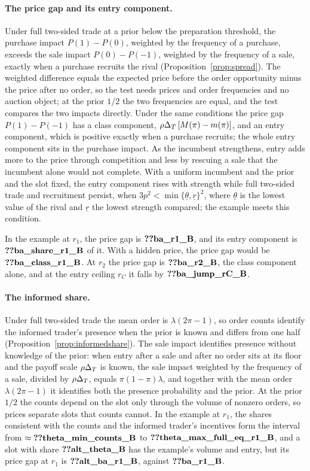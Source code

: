 \paragraph{The price gap and its entry component.} Under full two-sided trade at a prior below the preparation
threshold, the purchase impact \(P(1)-P(0)\), weighted by the frequency of a purchase, exceeds the sale impact
\(P(0)-P(-1)\), weighted by the frequency of a sale, exactly when a purchase recruits the rival
(Proposition~\ref{prop:spread}). The weighted difference equals the expected price before the order opportunity
minus the price after no order, so the test needs prices and order frequencies and no auction object; at the prior
\(1/2\) the two frequencies are equal, and the test compares the two impacts directly. Under the same conditions the
price gap \(P(1)-P(-1)\) has a class component, \(\rho\Delta_T\,[M(\pi)-m(\pi)]\), and an entry component, which is
positive exactly when a purchase recruits; the whole entry component sits in the purchase impact. As the incumbent
strengthens, entry adds more to the price through competition and less by rescuing a sale that the incumbent alone
would not complete. With a uniform incumbent and the prior and the slot fixed, the entry component rises with
strength while full two-sided trade and recruitment persist, when \(3p^2<\min\{\underline\theta,\underline r\}^2\),
where \(\underline\theta\) is the lowest value of the rival and \(\underline r\) the lowest strength compared; the
example meets this condition.

In the example at \(r_1\), the price gap is \(\reg{ba_r1_B}\), and its entry component is \(\reg{ba_share_r1_B}\) of
it. With a hidden price, the price gap would be \(\reg{ba_class_r1_B}\). At \(r_2\) the price gap is
\(\reg{ba_r2_B}\), the class component alone, and at the entry ceiling \(r_C\) it falls by \(\reg{ba_jump_rC_B}\).

\paragraph{The informed share.} Under full two-sided trade the mean order is \(\lambda(2\pi-1)\), so order counts
identify the informed trader's presence when the prior is known and differs from one half
(Proposition~\ref{prop:informedshare}). The sale impact identifies presence without knowledge of the prior:
when entry after a sale and after no order sits at its floor and the payoff scale \(\rho\Delta_T\) is known, the sale
impact weighted by the frequency of a sale, divided by \(\rho\Delta_T\), equals \(\pi(1-\pi)\lambda\), and together with
the mean order \(\lambda(2\pi-1)\) it identifies both the presence probability and the prior. At the prior
\(1/2\) the counts depend on the slot only through the volume of nonzero orders, so prices separate slots that counts
cannot. In the example at \(r_1\), the shares consistent with the counts and the informed trader's incentives form the
interval from \(\approx\reg{theta_min_counts_B}\) to \(\reg{theta_max_full_eq_r1_B}\), and a slot with share
\(\reg{alt_theta_B}\) has the example's volume and entry, but its price gap at \(r_1\) is \(\reg{alt_ba_r1_B}\),
against \(\reg{ba_r1_B}\).


